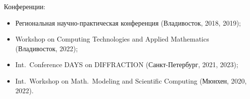 \begin{frame}
    Конференции:
    \small{
        \begin{itemize}
            \item Региональная научно-практическая конференция (Владивосток, 2018, 2019);
            \item Workshop on Computing Technologies and Applied Mathematics (Владивосток, 2022);
            \item Int.\ Conference DAYS on DIFFRACTION (Санкт-Петербург, 2021, 2023);
            \item Int.\ Workshop on Math.\ Modeling and Scientific Computing (Мюнхен, 2020, 2022).
        \end{itemize}
    }
\end{frame}
